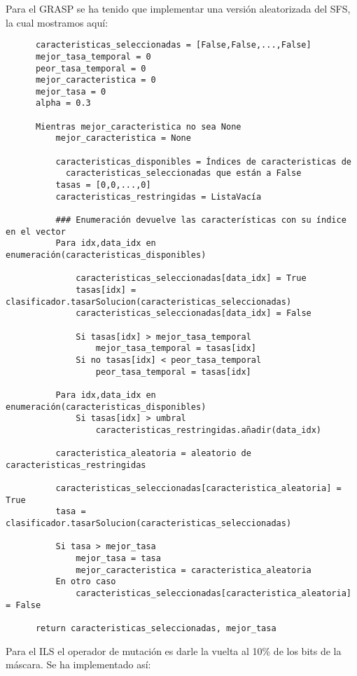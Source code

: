 \documentclass[a4paper, 11pt]{article}
\begin{document}
    Para el GRASP se ha tenido que implementar una versión aleatorizada del SFS, la cual mostramos aquí:

    \begin{verbatim}
      caracteristicas_seleccionadas = [False,False,...,False]
      mejor_tasa_temporal = 0
      peor_tasa_temporal = 0
      mejor_caracteristica = 0
      mejor_tasa = 0
      alpha = 0.3

      Mientras mejor_caracteristica no sea None
          mejor_caracteristica = None

          caracteristicas_disponibles = Índices de caracteristicas de
            caracteristicas_seleccionadas que están a False
          tasas = [0,0,...,0]
          caracteristicas_restringidas = ListaVacía

          ### Enumeración devuelve las características con su índice en el vector
          Para idx,data_idx en enumeración(caracteristicas_disponibles)

              caracteristicas_seleccionadas[data_idx] = True
              tasas[idx] = clasificador.tasarSolucion(caracteristicas_seleccionadas)
              caracteristicas_seleccionadas[data_idx] = False

              Si tasas[idx] > mejor_tasa_temporal
                  mejor_tasa_temporal = tasas[idx]
              Si no tasas[idx] < peor_tasa_temporal
                  peor_tasa_temporal = tasas[idx]

          Para idx,data_idx en enumeración(caracteristicas_disponibles)
              Si tasas[idx] > umbral
                  caracteristicas_restringidas.añadir(data_idx)

          caracteristica_aleatoria = aleatorio de caracteristicas_restringidas

          caracteristicas_seleccionadas[caracteristica_aleatoria] = True
          tasa = clasificador.tasarSolucion(caracteristicas_seleccionadas)

          Si tasa > mejor_tasa
              mejor_tasa = tasa
              mejor_caracteristica = caracteristica_aleatoria
          En otro caso
              caracteristicas_seleccionadas[caracteristica_aleatoria] = False

      return caracteristicas_seleccionadas, mejor_tasa
    \end{verbatim}

    Para el ILS el operador de mutación es darle la vuelta al 10\% de los bits de la máscara. Se ha implementado así:
\end{document}
